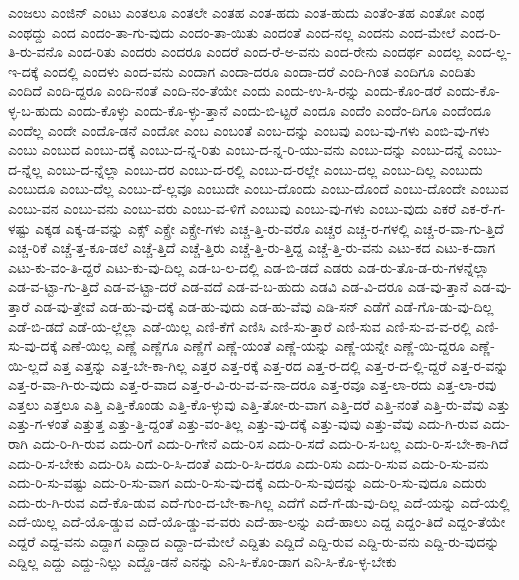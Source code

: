 {ಎಂಜಲು
ಎಂಜಿನ್
ಎಂಟು
ಎಂತಲೂ
ಎಂತಲೇ
ಎಂತಹ
ಎಂತ-ಹದು
ಎಂತ-ಹುದು
ಎಂತೆಂ-ತಹ
ಎಂತೋ
ಎಂಥ
ಎಂಥದ್ದು
ಎಂದ
ಎಂದಂ-ತಾ-ಗು-ವುದು
ಎಂದಂ-ತಾ-ಯಿತು
ಎಂದಂತೆ
ಎಂದ-ನಲ್ಲ
ಎಂದನು
ಎಂದ-ಮೇಲೆ
ಎಂದ-ರಿ-ತಿ-ರು-ವನೊ
ಎಂದ-ರಿತು
ಎಂದರು
ಎಂದರೂ
ಎಂದರೆ
ಎಂದ-ರೆ-ಅ-ವನು
ಎಂದ-ರೇನು
ಎಂದರ್ಥ
ಎಂದಲ್ಲ
ಎಂದ-ಲ್ಲ-ಇ-ದಕ್ಕೆ
ಎಂದಲ್ಲಿ
ಎಂದಳು
ಎಂದ-ವನು
ಎಂದಾಗ
ಎಂದಾ-ದರೂ
ಎಂದಾ-ದರೆ
ಎಂದಿ-ಗಿಂತ
ಎಂದಿಗೂ
ಎಂದಿತು
ಎಂದಿದೆ
ಎಂದಿ-ದ್ದರೂ
ಎಂದಿ-ನಂತೆ
ಎಂದಿ-ನಂ-ತೆಯೇ
ಎಂದು
ಎಂದು-ಉ-ಸಿ-ರನ್ನು
ಎಂದು-ಕೊಂ-ಡರೆ
ಎಂದು-ಕೊ-ಳ್ಳ-ಬ-ಹುದು
ಎಂದು-ಕೊಳ್ಳು
ಎಂದು-ಕೊ-ಳ್ಳು-ತ್ತಾನೆ
ಎಂದು-ಬಿ-ಟ್ಟರೆ
ಎಂದೂ
ಎಂದೆಂ
ಎಂದೆಂ-ದಿಗೂ
ಎಂದೆಂದೂ
ಎಂದೆಲ್ಲ
ಎಂದೇ
ಎಂದೊ-ಡನೆ
ಎಂದೋ
ಎಂಬ
ಎಂಬಂತೆ
ಎಂಬ-ದನ್ನು
ಎಂಬವು
ಎಂಬ-ವು-ಗಳು
ಎಂಬಿ-ವು-ಗಳು
ಎಂಬು
ಎಂಬುದ
ಎಂಬು-ದಕ್ಕೆ
ಎಂಬು-ದ-ನ್ನ-ರಿತು
ಎಂಬು-ದ-ನ್ನ-ರಿ-ಯು-ವನು
ಎಂಬು-ದನ್ನು
ಎಂಬು-ದನ್ನೆ
ಎಂಬು-ದ-ನ್ನೆಲ್ಲ
ಎಂಬು-ದ-ನ್ನೆಲ್ಲಾ
ಎಂಬು-ದರ
ಎಂಬು-ದ-ರಲ್ಲಿ
ಎಂಬು-ದ-ರಲ್ಲೇ
ಎಂಬು-ದಲ್ಲ
ಎಂಬು-ದಿಲ್ಲ
ಎಂಬುದು
ಎಂಬುದೂ
ಎಂಬು-ದೆಲ್ಲ
ಎಂಬು-ದೆ-ಲ್ಲವೂ
ಎಂಬುದೇ
ಎಂಬು-ದೊಂದು
ಎಂಬು-ದೊಂದೆ
ಎಂಬು-ದೊಂದೇ
ಎಂಬುವ
ಎಂಬು-ವನ
ಎಂಬು-ವನು
ಎಂಬು-ವರು
ಎಂಬು-ವ-ಳಿಗೆ
ಎಂಬುವು
ಎಂಬು-ವು-ಗಳು
ಎಂಬು-ವುದು
ಎಕರೆ
ಎಕ-ರೆ-ಗ-ಳಷ್ಟು
ಎಕ್ಕಡ
ಎಕ್ಕ-ಡ-ವನ್ನು
ಎಕ್ಸ್
ಎಕ್ಸ್ರೇ
ಎಕ್ಸ್ರೇ-ಗಳು
ಎಚ್ಚ-ತ್ತಿ-ರು-ವರೊ
ಎಚ್ಚರ
ಎಚ್ಚ-ರ-ಗಳಲ್ಲಿ
ಎಚ್ಚ-ರ-ವಾ-ಗು-ತ್ತಿದೆ
ಎಚ್ಚ-ರಿಕೆ
ಎಚ್ಚೆ-ತ್ತ-ಕೂ-ಡಲೆ
ಎಚ್ಚೆ-ತ್ತಿದೆ
ಎಚ್ಚೆ-ತ್ತಿರು
ಎಚ್ಚೆ-ತ್ತಿ-ರು-ತ್ತಿದ್ದ
ಎಚ್ಚೆ-ತ್ತಿ-ರು-ವನು
ಎಟು-ಕದ
ಎಟು-ಕ-ದಾಗ
ಎಟು-ಕು-ವಂ-ತಿ-ದ್ದರೆ
ಎಟು-ಕು-ವು-ದಿಲ್ಲ
ಎಡ-ಬ-ಲ-ದಲ್ಲಿ
ಎಡ-ಬಿ-ಡದೆ
ಎಡರು
ಎಡ-ರು-ತೊ-ಡ-ರು-ಗಳನ್ನೆಲ್ಲಾ
ಎಡ-ವ-ಟ್ಟಾ-ಗು-ತ್ತಿದೆ
ಎಡ-ವ-ಟ್ಟಾ-ದರೆ
ಎಡ-ವದೆ
ಎಡ-ವ-ಬ-ಹುದು
ಎಡವಿ
ಎಡ-ವಿ-ದರೂ
ಎಡ-ವು-ತ್ತಾನೆ
ಎಡ-ವು-ತ್ತಾರೆ
ಎಡ-ವು-ತ್ತೇವೆ
ಎಡ-ಹು-ವು-ದಕ್ಕೆ
ಎಡ-ಹು-ವುದು
ಎಡ-ಹು-ವೆವು
ಎಡಿ-ಸನ್
ಎಡೆಗೆ
ಎಡೆ-ಗೊ-ಡು-ವು-ದಿಲ್ಲ
ಎಡೆ-ಬಿ-ಡದೆ
ಎಡೆ-ಯ-ಲ್ಲೆಲ್ಲಾ
ಎಡೆ-ಯಿಲ್ಲ
ಎಣಿ-ಕೆಗೆ
ಎಣಿಸಿ
ಎಣಿ-ಸು-ತ್ತಾರೆ
ಎಣಿ-ಸುವ
ಎಣಿ-ಸು-ವ-ವ-ರಲ್ಲಿ
ಎಣಿ-ಸು-ವು-ದಕ್ಕೆ
ಎಣೆ-ಯಿಲ್ಲ
ಎಣ್ಣೆ
ಎಣ್ಣೆಗೂ
ಎಣ್ಣೆಗೆ
ಎಣ್ಣೆ-ಯಂತೆ
ಎಣ್ಣೆ-ಯನ್ನು
ಎಣ್ಣೆ-ಯನ್ನೇ
ಎಣ್ಣೆ-ಯಿ-ದ್ದರೂ
ಎಣ್ಣೆ-ಯಿ-ಲ್ಲದೆ
ಎತ್ತ
ಎತ್ತನ್ನು
ಎತ್ತ-ಬೇ-ಕಾ-ಗಿಲ್ಲ
ಎತ್ತರ
ಎತ್ತ-ರಕ್ಕೆ
ಎತ್ತ-ರದ
ಎತ್ತ-ರ-ದಲ್ಲಿ
ಎತ್ತ-ರ-ದ-ಲ್ಲಿ-ದ್ದರೆ
ಎತ್ತ-ರ-ವನ್ನು
ಎತ್ತ-ರ-ವಾ-ಗಿ-ರು-ವುದು
ಎತ್ತ-ರ-ವಾದ
ಎತ್ತ-ರ-ವಿ-ರು-ವ-ವ-ನಾ-ದರೂ
ಎತ್ತ-ರವೂ
ಎತ್ತ-ಲಾ-ರದು
ಎತ್ತ-ಲಾ-ರವು
ಎತ್ತಲು
ಎತ್ತಲೂ
ಎತ್ತಿ
ಎತ್ತಿ-ಕೊಂಡು
ಎತ್ತಿ-ಕೊ-ಳ್ಳುವು
ಎತ್ತಿ-ತೋ-ರು-ವಾಗ
ಎತ್ತಿ-ದರೆ
ಎತ್ತಿ-ನಂತೆ
ಎತ್ತಿ-ರು-ವೆವು
ಎತ್ತು
ಎತ್ತು-ಗ-ಳಂತೆ
ಎತ್ತುತ್ತ
ಎತ್ತು-ತ್ತಿ-ದ್ದಂತೆ
ಎತ್ತು-ವಂ-ತಿಲ್ಲ
ಎತ್ತು-ವು-ದಕ್ಕೆ
ಎತ್ತು-ವುವು
ಎತ್ತು-ವೆವು
ಎದು-ಗಿ-ರುವ
ಎದು-ರಾಗಿ
ಎದು-ರಿ-ಗಿ-ರುವ
ಎದು-ರಿಗೆ
ಎದು-ರಿ-ಗೇನೆ
ಎದು-ರಿಸ
ಎದು-ರಿ-ಸದೆ
ಎದು-ರಿ-ಸ-ಬಲ್ಲ
ಎದು-ರಿ-ಸ-ಬೇ-ಕಾ-ಗಿದೆ
ಎದು-ರಿ-ಸ-ಬೇಕು
ಎದು-ರಿಸಿ
ಎದು-ರಿ-ಸಿ-ದಂತೆ
ಎದು-ರಿ-ಸಿ-ದರೂ
ಎದು-ರಿಸು
ಎದು-ರಿ-ಸುವ
ಎದು-ರಿ-ಸು-ವನು
ಎದು-ರಿ-ಸು-ವಷ್ಟು
ಎದು-ರಿ-ಸು-ವಾಗ
ಎದು-ರಿ-ಸು-ವು-ದಕ್ಕೆ
ಎದು-ರಿ-ಸು-ವುದನ್ನು
ಎದು-ರಿ-ಸು-ವುದೂ
ಎದುರು
ಎದು-ರು-ಗಿ-ರುವ
ಎದೆ-ಕೊ-ಡುವ
ಎದೆ-ಗುಂ-ದ-ಬೇ-ಕಾ-ಗಿಲ್ಲ
ಎದೆಗೆ
ಎದೆ-ಗೆ-ಡು-ವು-ದಿಲ್ಲ
ಎದೆ-ಯನ್ನು
ಎದೆ-ಯಲ್ಲಿ
ಎದೆ-ಯಿಲ್ಲ
ಎದೆ-ಯೊ-ಡ್ಡುವ
ಎದೆ-ಯೊ-ಡ್ಡು-ವ-ವರು
ಎದೆ-ಹಾ-ಲನ್ನು
ಎದೆ-ಹಾಲು
ಎದ್ದ
ಎದ್ದಂ-ತಿದೆ
ಎದ್ದಂ-ತೆಯೇ
ಎದ್ದರೆ
ಎದ್ದ-ವನು
ಎದ್ದಾಗ
ಎದ್ದಾದ
ಎದ್ದಾ-ದ-ಮೇಲೆ
ಎದ್ದಿತು
ಎದ್ದಿದೆ
ಎದ್ದಿ-ರುವ
ಎದ್ದಿ-ರು-ವನು
ಎದ್ದಿ-ರು-ವುದನ್ನು
ಎದ್ದಿಲ್ಲ
ಎದ್ದು
ಎದ್ದು-ನಿಲ್ಲು
ಎದ್ದೊ-ಡನೆ
ಎನನ್ನು
ಎನಿ-ಸಿ-ಕೊಂ-ಡಾಗ
ಎನಿ-ಸಿ-ಕೊ-ಳ್ಳ-ಬೇಕು
}
